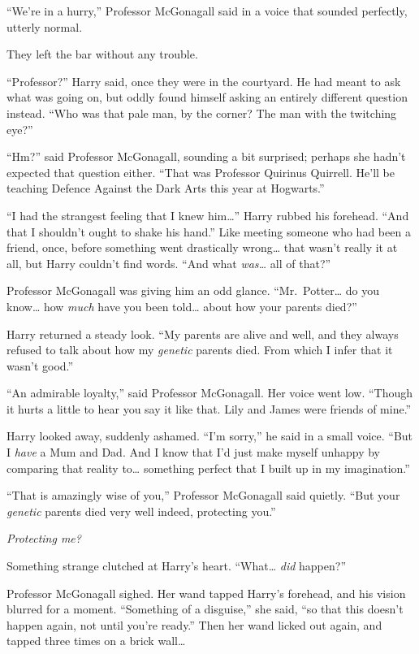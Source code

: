 ``We're in a hurry,'' Professor McGonagall said in a voice that sounded
perfectly, utterly normal.

They left the bar without any trouble.

``Professor?'' Harry said, once they were in the courtyard. He had meant
to ask what was going on, but oddly found himself asking an entirely
different question instead. ``Who was that pale man, by the corner? The
man with the twitching eye?''

``Hm?'' said Professor McGonagall, sounding a bit surprised; perhaps she
hadn't expected that question either. ``That was Professor Quirinus
Quirrell. He'll be teaching Defence Against the Dark Arts this year at
Hogwarts.''

``I had the strangest feeling that I knew him\ldots{}'' Harry rubbed his
forehead. ``And that I shouldn't ought to shake his hand.'' Like meeting
someone who had been a friend, once, before something went drastically
wrong\ldots{} that wasn't really it at all, but Harry couldn't find
words. ``And what \emph{was\ldots{}} all of that?''

Professor McGonagall was giving him an odd glance. ``Mr.~Potter\ldots{}
do you know\ldots{} how \emph{much} have you been told\ldots{} about how
your parents died?''

Harry returned a steady look. ``My parents are alive and well, and they
always refused to talk about how my \emph{genetic} parents died. From
which I infer that it wasn't good.''

``An admirable loyalty,'' said Professor McGonagall. Her voice went low.
``Though it hurts a little to hear you say it like that. Lily and James
were friends of mine.''

Harry looked away, suddenly ashamed. ``I'm sorry,'' he said in a small
voice. ``But I \emph{have} a Mum and Dad. And I know that I'd just make
myself unhappy by comparing that reality to\ldots{} something perfect
that I built up in my imagination.''

``That is amazingly wise of you,'' Professor McGonagall said quietly.
``But your \emph{genetic} parents died very well indeed, protecting
you.''

\emph{Protecting me?}

Something strange clutched at Harry's heart. ``What\ldots{} \emph{did}
happen?''

Professor McGonagall sighed. Her wand tapped Harry's forehead, and his
vision blurred for a moment. ``Something of a disguise,'' she said, ``so
that this doesn't happen again, not until you're ready.'' Then her wand
licked out again, and tapped three times on a brick wall\ldots{}


